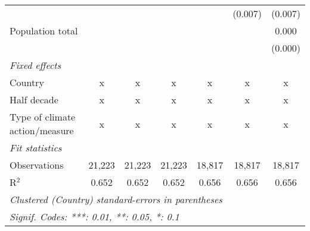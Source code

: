 \begin{tabular}{lcccccc}
                                            &               &                &                &               & (0.007)       & (0.007)\\   
   Population total                         &               &                &                &               &               & 0.000\\   
                                            &               &                &                &               &               & (0.000)\\   
   \emph{Fixed effects}\\
   Country                                  & x             & x              & x              & x             & x             & x\\  
   Half decade                              & x             & x              & x              & x             & x             & x\\  
   Type of climate action/measure           & x             & x              & x              & x             & x             & x\\  
   \midrule \emph{Fit statistics}\\
   Observations                             & 21,223        & 21,223         & 21,223         & 18,817        & 18,817        & 18,817\\  
   R$^2$                                    & 0.652         & 0.652          & 0.652          & 0.656         & 0.656         & 0.656\\  
   \midrule
   \multicolumn{7}{l}{\emph{Clustered (Country) standard-errors in parentheses}}\\
   \multicolumn{7}{l}{\emph{Signif. Codes: ***: 0.01, **: 0.05, *: 0.1}}\\
\end{tabular}
\par\endgroup


